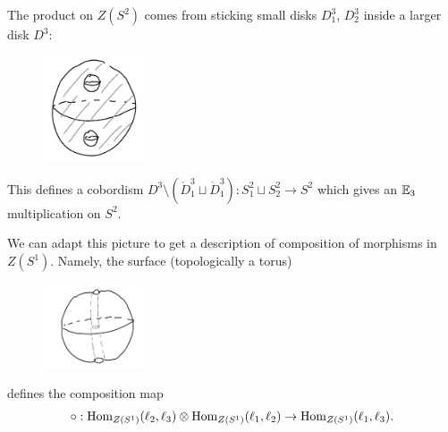 \noindent The product on $Z(S^2)$ comes from sticking small disks $D^3_1$, $D^3_2$ inside a larger disk $D^3$:
\begin{figure}[htp]
    \centering
    \includegraphics[width=3cm]{frilec1graphics/E3mult.png}
\end{figure}

\noindent This defines a cobordism $D^3 \setminus (\mathring{D}^3_1 \sqcup \mathring{D}^3_1): S^2_1 \sqcup S^2_2 \to S^2$
which gives an $\mathbb{E}_3$ multiplication on $S^2$.

We can adapt this picture to get a description of composition of morphisms in $Z(S^1)$.
Namely, the surface (topologically a torus)
\begin{figure}[!htp]
    \centering
    \includegraphics[width=3cm]{frilec1graphics/compos.png}
\end{figure}

\noindent defines the composition map
\begin{equation}
\circ: \mathrm{Hom}_{Z(S^1)}(\ell_2, \ell_3) \otimes \mathrm{Hom}_{Z(S^1)}(\ell_1, \ell_2) \to \mathrm{Hom}_{Z(S^1)}(\ell_1, \ell_3).
\end{equation}

